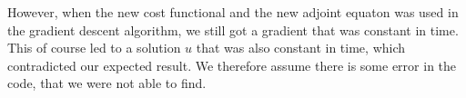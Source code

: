 However, when the new cost functional and the new adjoint equaton was used in the gradient descent algorithm, we still got a gradient that was constant in time. This of course led to a solution $u$ that was also constant in time, which contradicted our expected result. We therefore assume there is some error in the code, that we were not able to find.